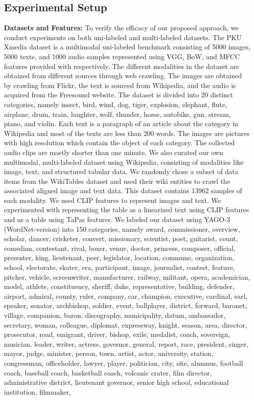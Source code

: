 \subsection{Experimental Setup}
\noindent\textbf{Datasets and Features: }To verify the efficacy of our proposed approach, we conduct experiments on both uni-labeled and multi-labeled datasets. The PKU Xmedia dataset is a multimodal uni-labeled benchmark consisting of 5000 images, 5000 texts, and 1000 audio samples represented using VGG, BoW, and MFCC features provided with \cite{xmedianet, JRL} respectively. The different modalities in the dataset are obtained from different sources through web crawling. The images are obtained by crawling from Flickr, the text is sourced from Wikipedia, and the audio is acquired from the Freesound website. The dataset is divided into 20 distinct categories, namely insect, bird, wind, dog, tiger, explosion, elephant, flute, airplane, drum, train, laughter, wolf, thunder, horse, autobike, gun, stream, piano, and violin. Each text is a paragraph of an article about the category in Wikipedia and most of the texts are less than 200 words. The images are pictures with high resolution which contain the object of each category. The collected audio clips are mostly shorter than one minute. We also curated our own multimodal, multi-labeled dataset using Wikipedia, consisting of modalities like image, text, and structured tabular data. We randomly chose a subset of data items from the WikiTables dataset \cite{wikitables} and used their wiki entities to crawl the associated aligned image and text data. This dataset contains 13962 samples of each modality. We used CLIP features to represent images and text. We experimented with representing the table as a linearized text using CLIP features and as a table using TaPas \cite{tapas} features. We labeled our dataset using YAGO-3 (WordNet-version) into 150 categories, namely award, commissioner, overview, scholar, dancer, cricketer, convert, missionary, scientist, poet, guitarist, count, comedian, contestant, rival, boxer, venue, doctor, princess, composer, official, presenter, king, lieutenant, peer, legislator, location, commune, organization, school, electorate, skater, era, participant, image, journalist, contest, feature, pitcher, vehicle, screenwriter, manufacturer, railway, militant, opera, academician, model, athlete, constituency, sheriff, duke, representative, building, defender, airport, admiral, county, ruler, company, car, champion, executive, cardinal, earl, speaker, senator, archbishop, soldier, event, ballplayer, district, forward, baronet, village, companion, baron, discography, municipality, datum, ambassador, secretary, woman, colleague, diplomat, expressway, knight, season, area, director, prosecutor, road, emigrant, driver, bishop, exile, medalist, coach, sovereign, musician, leader, writer, actress, governor, general, report, race, president, singer, mayor, judge, minister, person, town, artist, actor, university, station, congressman, officeholder, lawyer, player, politician, city, site, alumnus, football coach, baseball coach, basketball coach, volcanic crater, film director, administrative district, lieutenant governor, senior high school, educational institution, filmmaker, 